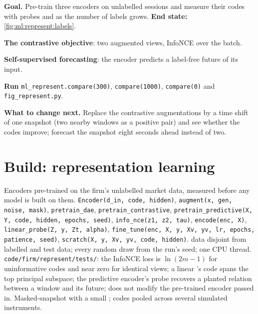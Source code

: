 \begin{tutorial}
\textbf{Goal.} Pre-train three encoders on unlabelled sessions and measure their codes with probes and  as the
number of labels grows. \textbf{End state:} \cref{fig:ml:represent:labels}.
\begin{tutsteps}
\item \textbf{The contrastive objective}: two augmented views, InfoNCE over the batch.
\label{lst:ml:represent:contrastive}
\item \textbf{Self-supervised forecasting}: the encoder predicts a label-free future of its input.
\label{lst:ml:represent:predictive}
\item \textbf{Run} \texttt{ml\_represent.compare(300)}, \texttt{compare(1000)}, \texttt{compare(0)} and
\texttt{fig\_represent.py}.
\end{tutsteps}
\textbf{What to change next.} Replace the contrastive augmentations by a time shift of one snapshot (two nearby windows as a
positive pair) and see whether the codes improve; forecast the snapshot eight seconds ahead instead of two.
\end{tutorial}

\section{Build: representation learning}\label{bld:ml:representation-learning:represent}

\begin{build}
 Encoders pre-trained on the firm's unlabelled market data, measured before any model is built on them.
 \texttt{Encoder(d\_in, code, hidden)}, \texttt{augment(x, gen, noise, mask)},
\texttt{pretrain\_dae}, \texttt{pretrain\_contrastive}, \texttt{pretrain\_predictive(X, Y, code, hidden, epochs, seed)},
\texttt{info\_nce(z1, z2, tau)}, \texttt{encode(enc, X)}, \texttt{linear\_probe(Z, y, Zt, alpha)},
\texttt{fine\_tune(enc, X, y, Xv, yv, lr, epochs, patience, seed)}, \texttt{scratch(X, y, Xv, yv, code, hidden)}.
  data disjoint from labelled and test data; every random draw from the run's seed; one CPU
thread.
 \texttt{code/firm/represent/tests/}: the InfoNCE loss is $\ln(2m-1)$ for uninformative codes and
near zero for identical views; a linear 's code spans the top principal subspace; the predictive
encoder's probe recovers a planted relation between a window and its future;  does not modify the pre-trained
encoder passed in.
 Masked-snapshot  with a small ; codes pooled across several simulated
instruments.
\end{build}

